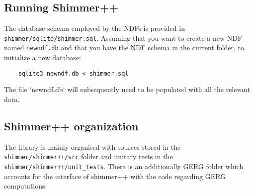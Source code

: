 
\subsection{Running Shimmer++}
The database schema employed by the NDFs is provided in \texttt{shimmer/sqlite/shimmer.sql}. Assuming that you want to create a new NDF named \texttt{newndf.db} and that you have the NDF schema in the current folder, to initialize a new database:
\begin{verbatim}
    sqlite3 newndf.db < shimmer.sql
\end{verbatim}
The file `newndf.db` will subsequently need to be populated with all the relevant data.

\subsection{Shimmer++ organization}
The library is mainly organised with sources stored in the \texttt{shimmer/shimmer++/src} folder and unitary tests in the \texttt{shimmer/shimmer++/unit\_tests}. There is an additionally GERG folder which accounts for the interface of shimmer++ with the code regarding GERG computations.



